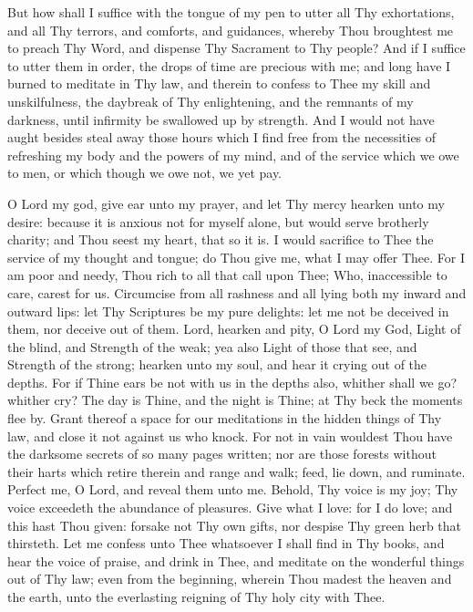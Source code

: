\documentclass[b5paper,openright,12pt,twoside]{book}
\begin{document}
But how shall I suffice with the tongue of my pen to utter all Thy
exhortations, and all Thy terrors, and comforts, and guidances, whereby
Thou broughtest me to preach Thy Word, and dispense Thy Sacrament to Thy
people? And if I suffice to utter them in order, the drops of time are
precious with me; and long have I burned to meditate in Thy law, and
therein to confess to Thee my skill and unskilfulness, the daybreak of
Thy enlightening, and the remnants of my darkness, until infirmity be
swallowed up by strength. And I would not have aught besides steal away
those hours which I find free from the necessities of refreshing my body
and the powers of my mind, and of the service which we owe to men, or
which though we owe not, we yet pay.

O Lord my god, give ear unto my prayer, and let Thy mercy hearken unto
my desire: because it is anxious not for myself alone, but would serve
brotherly charity; and Thou seest my heart, that so it is. I would
sacrifice to Thee the service of my thought and tongue; do Thou give me,
what I may offer Thee. For I am poor and needy, Thou rich to all that
call upon Thee; Who, inaccessible to care, carest for us. Circumcise
from all rashness and all lying both my inward and outward lips: let
Thy Scriptures be my pure delights: let me not be deceived in them, nor
deceive out of them. Lord, hearken and pity, O Lord my God, Light of the
blind, and Strength of the weak; yea also Light of those that see, and
Strength of the strong; hearken unto my soul, and hear it crying out of
the depths. For if Thine ears be not with us in the depths also, whither
shall we go? whither cry? The day is Thine, and the night is Thine; at
Thy beck the moments flee by. Grant thereof a space for our meditations
in the hidden things of Thy law, and close it not against us who knock.
For not in vain wouldest Thou have the darksome secrets of so many pages
written; nor are those forests without their harts which retire therein
and range and walk; feed, lie down, and ruminate. Perfect me, O
Lord, and reveal them unto me. Behold, Thy voice is my joy; Thy voice
exceedeth the abundance of pleasures. Give what I love: for I do love;
and this hast Thou given: forsake not Thy own gifts, nor despise Thy
green herb that thirsteth. Let me confess unto Thee whatsoever I shall
find in Thy books, and hear the voice of praise, and drink in Thee,
and meditate on the wonderful things out of Thy law; even from the
beginning, wherein Thou madest the heaven and the earth, unto the
everlasting reigning of Thy holy city with Thee.
\end{document}
